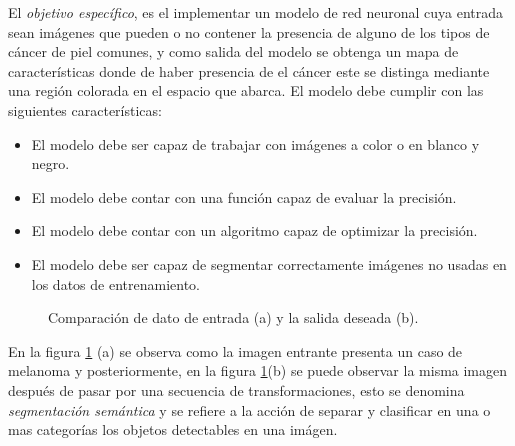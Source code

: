 El \emph{objetivo específico}, es el implementar un modelo de red neuronal cuya entrada sean imágenes que pueden o no contener la presencia de alguno de los tipos de cáncer de piel comunes, y como salida del modelo se obtenga un mapa de características donde de haber presencia de el cáncer este se distinga mediante una región colorada en el espacio que abarca. El modelo debe cumplir con las siguientes características:

\begin{itemize}
    \item El modelo debe ser capaz de trabajar con imágenes a color o en blanco y negro.
    \item El modelo debe contar con una función capaz de evaluar la precisión.
    \item El modelo debe contar con un algoritmo capaz de optimizar la precisión.
    \item El modelo debe ser capaz de segmentar correctamente imágenes no usadas en los datos de entrenamiento.
\end{itemize}

\begin{figure}[!htp]
    \centering
    \qquad
    \caption{Comparación de dato de entrada (a) y la salida deseada (b).}
    \label{data_1}
\end{figure}

En la figura \ref{data_1} (a) se observa como la imagen entrante presenta un caso de melanoma y posteriormente, en la figura \ref{data_1}(b) se puede observar la misma imagen después de pasar por una secuencia de transformaciones, esto se denomina \emph{segmentación semántica} y se refiere a la acción de separar y clasificar en una o mas categorías los objetos detectables en una imágen.

